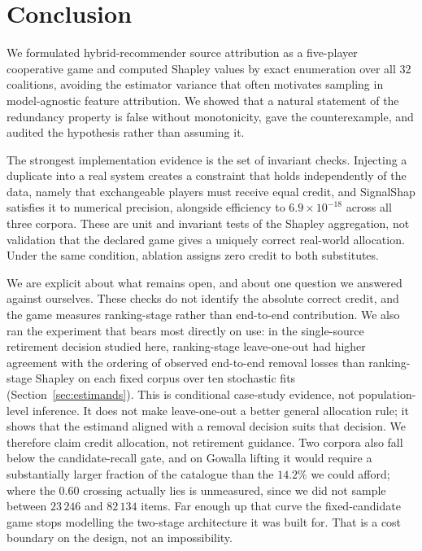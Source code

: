\documentclass[pdflatex,sn-basic,Numbered]{sn-jnl}
\theoremstyle{plain}
\theoremstyle{definition}
\begin{document}
\section{Conclusion}\label{sec:conclusion}

We formulated hybrid-recommender source attribution as a five-player
cooperative game and computed Shapley values by exact enumeration over all 32
coalitions, avoiding the estimator variance that often motivates sampling in
model-agnostic feature attribution. We showed that a natural statement of the redundancy property is
false without monotonicity, gave the counterexample, and audited the hypothesis
rather than assuming it.

The strongest implementation evidence is the set of invariant checks. Injecting a duplicate
into a real system creates a constraint that holds independently of the data, namely that exchangeable players must receive equal credit, and SignalShap satisfies it
to numerical precision, alongside efficiency to
$6.9\times10^{-18}$ across all three corpora. These are unit and invariant
tests of the Shapley aggregation, not validation that the declared game gives a
uniquely correct real-world allocation. Under the same
condition, ablation assigns zero credit to both substitutes.

We are explicit about what remains open, and about one question we answered
against ourselves. These checks do not identify the absolute correct credit,
and the game measures ranking-stage rather than end-to-end contribution. We also ran the experiment that bears most
directly on use: in the single-source retirement decision studied here,
ranking-stage leave-one-out had higher agreement with the ordering of observed
end-to-end removal losses than ranking-stage Shapley on each fixed corpus over
ten stochastic fits (Section~\ref{sec:estimands}). This is conditional
case-study evidence, not population-level inference. It does not make
leave-one-out a better general allocation rule; it shows that the estimand aligned with a
removal decision suits that decision. We therefore claim credit allocation, not
retirement guidance. Two corpora also fall below the candidate-recall gate, and
on Gowalla lifting it would require a substantially larger fraction of the
catalogue than the $14.2\%$ we could afford; where the $0.60$ crossing actually
lies is unmeasured, since we did not sample between $23\,246$ and $82\,134$
items. Far enough up that curve the fixed-candidate game stops modelling the
two-stage architecture it was built for. That is a cost boundary on the design,
not an impossibility.
\end{document}
